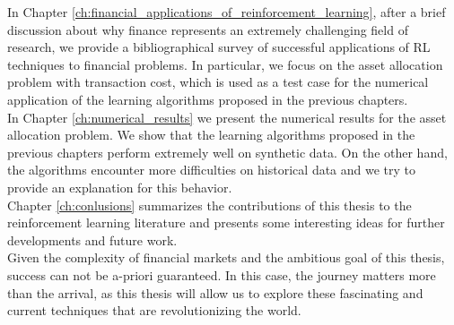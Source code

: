 In Chapter \ref{ch:financial_applications_of_reinforcement_learning}, after a brief discussion about why finance represents an extremely challenging field of research, we provide a bibliographical survey of successful applications of \gls{RL} techniques to financial problems. In particular, we focus on the asset allocation problem with transaction cost, which is used as a test case for the numerical application of the learning algorithms proposed in the previous chapters.\\
In Chapter \ref{ch:numerical_results} we present the numerical results for the asset allocation problem. We show that the learning algorithms proposed in the previous chapters perform extremely well on synthetic data. On the other hand, the algorithms encounter more difficulties on historical data and we try to provide an explanation for this behavior.\\
Chapter \ref{ch:conlusions} summarizes the contributions of this thesis to the reinforcement learning literature and presents some interesting ideas for further developments and future work.\\
Given the complexity of financial markets and the ambitious goal of this thesis, success can not be a-priori guaranteed. In this case, the journey matters more than the arrival, as this thesis will allow us to explore these fascinating and current techniques that are revolutionizing the world.  



